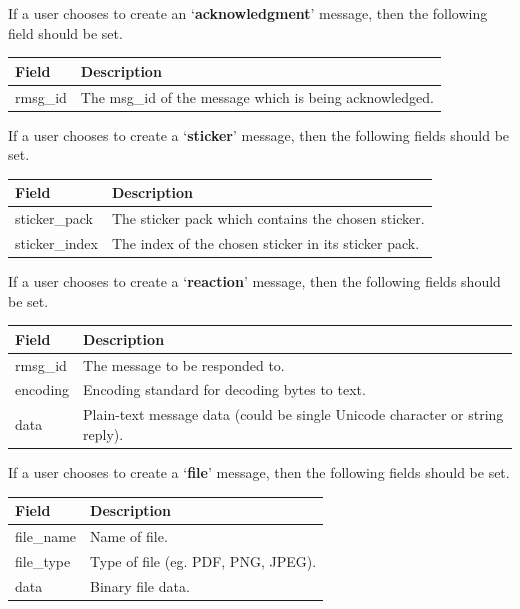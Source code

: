 \documentclass{article}
\begin{document}
If a user chooses to create an `\textbf{acknowledgment}' message, then the following field should be set.
\begin{table}[H]
\centering
\begin{tabular}{|p{2.5cm}|p{8.5cm}|}
\hline
\rowcolor{tblgrey} 
Field           & Description                                               \\ \hline
rmsg\_id         & The msg\_id of the message which is being acknowledged.   \\ \hline
\end{tabular}
\end{table}

If a user chooses to create a `\textbf{sticker}' message, then the following fields should be set.
\begin{table}[H]
\centering
\begin{tabular}{|p{2.5cm}|p{8.5cm}|}
\hline
\rowcolor{tblgrey} 
Field           & Description                                               \\ \hline
sticker\_pack   & The sticker pack which contains the chosen sticker.       \\ \hline
sticker\_index  & The index of the chosen sticker in its sticker pack.      \\ \hline
\end{tabular}
\end{table}

If a user chooses to create a `\textbf{reaction}' message, then the following fields should be set.
\begin{table}[H]
\centering
\begin{tabular}{|p{2.5cm}|p{8.5cm}|}
\hline
\rowcolor{tblgrey} 
Field           & Description                                               \\ \hline
rmsg\_id         & The message to be responded to.                           \\ \hline
encoding        & Encoding standard for decoding bytes to text.      \\ \hline
data            & Plain-text message data (could be single Unicode character or string reply).      \\ \hline
\end{tabular}
\end{table}

If a user chooses to create a `\textbf{file}' message, then the following fields should be set.
\begin{table}[H]
\centering
\begin{tabular}{|p{2.5cm}|p{8.5cm}|}
\hline
\rowcolor{tblgrey} 
Field           & Description                                               \\ \hline
file\_name      & Name of file.                                             \\ \hline
file\_type      & Type of file (eg. PDF, PNG, JPEG).                        \\ \hline
data            & Binary file data.                                         \\ \hline
\end{tabular}
\end{table}
\end{document}
